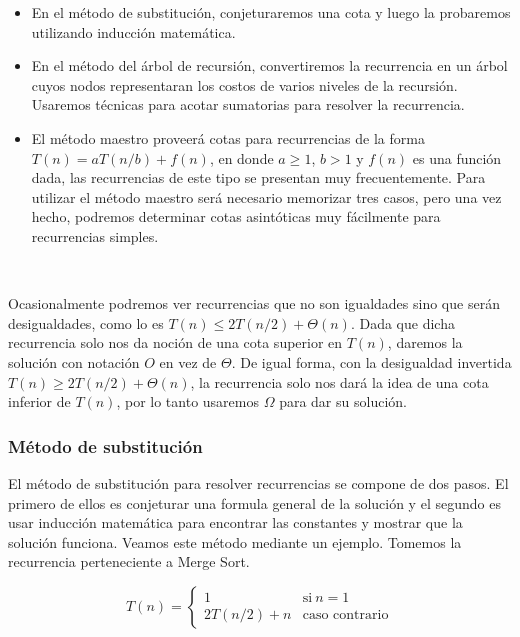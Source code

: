 \begin{itemize}
 \item En el m\'etodo de substituci\'on, conjeturaremos una cota y luego la probaremos utilizando inducci\'on matem\'atica.
 \item En el m\'etodo del \'arbol de recursi\'on, convertiremos la recurrencia en un \'arbol cuyos nodos representaran los costos de varios niveles de la recursi\'on. Usaremos t\'ecnicas para acotar sumatorias para resolver la recurrencia.
 \item El m\'etodo maestro proveer\'a cotas para recurrencias de la forma $T(n) = aT(n/b) + f(n)$, en donde $a \geq 1$, $b > 1$ y $f(n)$ es una funci\'on dada, las recurrencias de este tipo se presentan muy frecuentemente. Para utilizar el m\'etodo maestro ser\'a necesario memorizar tres casos, pero una vez hecho, podremos determinar cotas asint\'oticas muy f\'acilmente para recurrencias simples.
\end{itemize}

~

Ocasionalmente podremos ver recurrencias que no son igualdades sino que ser\'an desigualdades, como lo es $T(n) \leq 2T(n/2) + \Theta(n)$. Dada que dicha recurrencia solo nos da noci\'on de una cota superior en $T(n)$, daremos la soluci\'on con notaci\'on $O$ en vez de $\Theta$. De igual forma, con la desigualdad invertida $T(n) \geq 2T(n/2) + \Theta(n)$, la recurrencia solo nos dar\'a la idea de una cota inferior de $T(n)$, por lo tanto usaremos $\Omega$ para dar su soluci\'on.

\subsubsection{M\'etodo de substituci\'on}

El m\'etodo de substituci\'on para resolver recurrencias se compone de dos pasos. El primero de ellos es conjeturar una formula general de la soluci\'on y el segundo es usar inducci\'on matem\'atica para encontrar las constantes y mostrar que la soluci\'on funciona. Veamos este m\'etodo mediante un ejemplo. Tomemos la recurrencia perteneciente a Merge Sort.

\begin{equation*}
  T(n) = \begin{cases}
	      1         		& \text{si} \ n = 1 \\
	      2T(n/2) + n         	& \text{caso contrario}
	  \end{cases}
\end{equation*}

